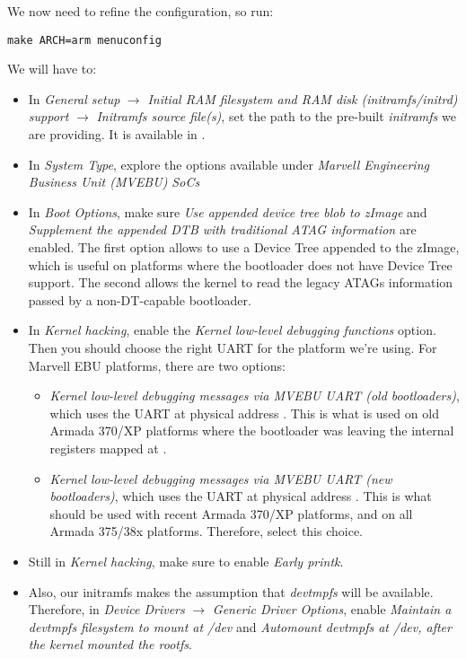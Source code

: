 We now need to refine the configuration, so run:

\begin{verbatim}
make ARCH=arm menuconfig
\end{verbatim}

We will have to:

\begin{itemize}
\item In {\em General setup} $\rightarrow$ {\em Initial RAM filesystem
    and RAM disk (initramfs/initrd) support} $\rightarrow$ {\em
    Initramfs source file(s)}, set the path to the pre-built {\em
    initramfs} we are providing. It is available in
  .
\item In {\em System Type}, explore the options available under {\em
    Marvell Engineering Business Unit (MVEBU) SoCs}
\item In {\em Boot Options}, make sure {\em Use appended device tree
    blob to zImage} and {\em Supplement the appended DTB with
    traditional ATAG information} are enabled. The first option allows
  to use a Device Tree appended to the zImage, which is useful on
  platforms where the bootloader does not have Device Tree
  support. The second allows the kernel to read the legacy ATAGs
  information passed by a non-DT-capable bootloader.
\item In {\em Kernel hacking}, enable the {\em Kernel low-level
    debugging functions} option. Then you should choose the right UART
  for the platform we're using. For Marvell EBU platforms, there are
  two options:
  \begin{itemize}
  \item {\em Kernel low-level debugging messages via MVEBU UART (old
      bootloaders)}, which uses the UART at physical address
    . This is what is used on old Armada 370/XP
    platforms where the bootloader was leaving the internal registers
    mapped at .
  \item {\em Kernel low-level debugging messages via MVEBU UART (new
      bootloaders)}, which uses the UART at physical address
    . This is what should be used with recent Armada
    370/XP platforms, and on all Armada 375/38x platforms. Therefore,
    select this choice.
  \end{itemize}
\item Still in {\em Kernel hacking}, make sure to enable {\em Early
    printk}.
\item Also, our initramfs makes the assumption that {\em devtmpfs}
  will be available. Therefore, in {\em Device Drivers} $\rightarrow$
  {\em Generic Driver Options}, enable {\em Maintain a devtmpfs
    filesystem to mount at /dev} and {\em Automount devtmpfs at /dev,
    after the kernel mounted the rootfs}.
\end{itemize}

